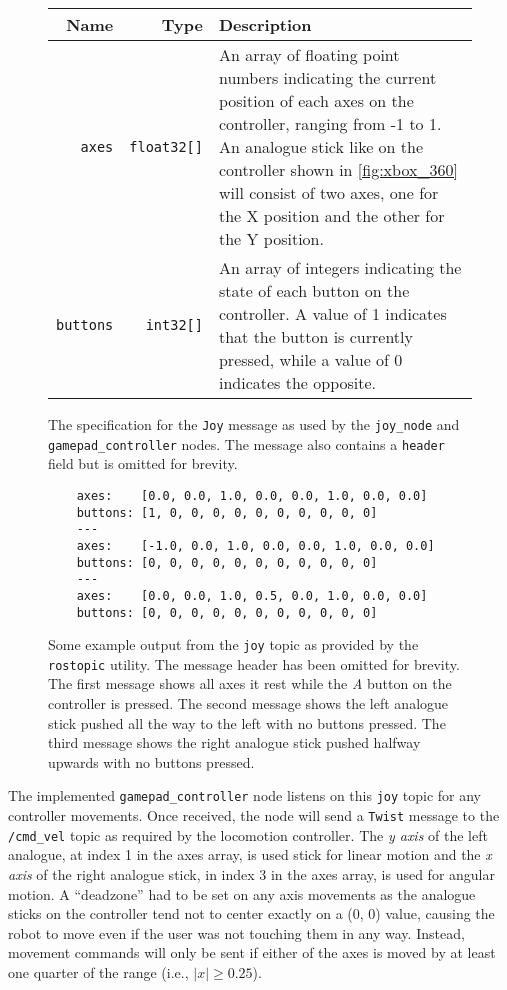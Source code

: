 \begin{figure}[!h]
	\centering
	\begin{tabular}{ r r p{10cm} }
		\textbf{Name} & \textbf{Type} & \textbf{Description} \\
		\hline

		\texttt{axes} & 
		\texttt{float32[]} &
		An array of floating point numbers indicating the current position of each axes on the controller, ranging from -1 to 1. An analogue stick like on the controller shown in \autoref{fig:xbox_360} will consist of two axes, one for the X position and the other for the Y position. \\
		
		\texttt{buttons} & 
		\texttt{int32[]} & 
		An array of integers indicating the state of each button on the controller. A value of 1 indicates that the button is currently pressed, while a value of 0 indicates the opposite. \\
	\end{tabular}
	\caption{The specification for the \texttt{Joy} message as used by the \texttt{joy\_node} and \texttt{gamepad\_controller} nodes. The message also contains a \texttt{header} field but is omitted for brevity.}
	\label{fig:joy_msg}
\end{figure}

\begin{figure}[!h]
	\centering
	\begin{lstlisting}
	axes:    [0.0, 0.0, 1.0, 0.0, 0.0, 1.0, 0.0, 0.0]
	buttons: [1, 0, 0, 0, 0, 0, 0, 0, 0, 0, 0]
	---
	axes:    [-1.0, 0.0, 1.0, 0.0, 0.0, 1.0, 0.0, 0.0]
	buttons: [0, 0, 0, 0, 0, 0, 0, 0, 0, 0, 0]
	---
	axes:    [0.0, 0.0, 1.0, 0.5, 0.0, 1.0, 0.0, 0.0]
	buttons: [0, 0, 0, 0, 0, 0, 0, 0, 0, 0, 0]
	\end{lstlisting}
	\caption{Some example output from the \texttt{joy} topic as provided by the \texttt{rostopic} utility. The message header has been omitted for brevity. The first message shows all axes it rest while the \emph{A} button on the controller is pressed. The second message shows the left analogue stick pushed all the way to the left with no buttons pressed. The third message shows the right analogue stick pushed halfway upwards with no buttons pressed.}
	\label{fig:joy_example}
\end{figure}

The implemented \texttt{gamepad\_controller} node listens on this \texttt{joy} topic for any controller movements. Once received, the node will send a \texttt{Twist} message to the \texttt{/cmd\_vel} topic as required by the locomotion controller. The \emph{y axis} of the left analogue, at index 1 in the axes array, is used stick for linear motion and the \emph{x axis} of the right analogue stick, in index 3 in the axes array, is used for angular motion. A ``deadzone'' had to be set on any axis movements as the analogue sticks on the controller tend not to center exactly on a (0, 0) value, causing the robot to move even if the user was not touching them in any way. Instead, movement commands will only be sent if either of the axes is moved by at least one quarter of the range (i.e., $|x| \geq 0.25$).

